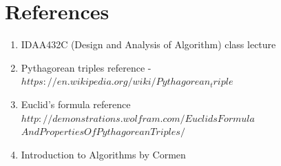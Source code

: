 \documentclass[twocolumn]{article}      %
\begin{document}
\section{References}
\begin{enumerate}
\item IDAA432C (Design and Analysis of Algorithm) class lecture
\item Pythagorean triples reference -\\${https://en.wikipedia.org/wiki/Pythagorean_triple}$
\item Euclid's formula  reference\\
${http://demonstrations.wolfram.com/EuclidsFormula}$\\${AndPropertiesOfPythagoreanTriples/}$
\item Introduction to Algorithms by Cormen
\end{enumerate}
\end{document}
